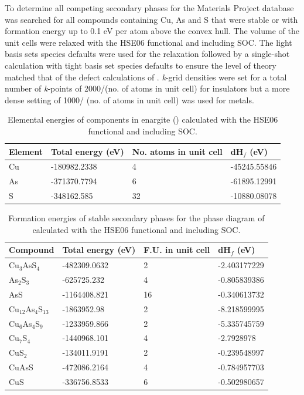 \documentclass[11pt, twoside]{report}
\begin{document}
To determine all competing secondary phases for {\enargite} the Materials Project \cite{materials_project} database was searched for all compounds containing Cu, As and S that were stable or with formation energy up to 0.1 eV per atom above the convex hull. The volume of the unit cells were relaxed with the HSE06 functional and including SOC. The light basis sets species defaults were used for the relaxation followed by a single-shot calculation with tight basis set species defaults to ensure the level of theory matched that of the defect calculations of {\enargite}. \textit{k}-grid densities were set for a total number of \textit{k}-points of 2000/(no. of atoms in unit cell) for insulators but a more dense setting of 1000/ (no. of atoms in unit cell) was used for metals.

\begin{table}[h!]
\begin{tabular}{@{}llll@{}}
\toprule
Element & Total energy (eV) & No. atoms in unit cell & dH$_f$ (eV)      \\ \midrule
Cu      & -180982.2338      & 4                      & -45245.55846 \\
As      & -371370.7794      & 6                      & -61895.12991 \\
S       & -348162.585       & 32                     & -10880.08078 \\ \bottomrule
\end{tabular}
\caption{Elemental energies of components in enargite ({\enargite}) calculated with the HSE06 functional and including SOC.}\label{enargite_elements}
\end{table}

\begin{table}[]\label{enargite_elements}
\begin{tabular}{@{}llll@{}}
\toprule
Compound      & Total energy (eV) & F.U. in unit cell & dH$_f$ (eV)     \\ \midrule
Cu$_3$AsS$_4$ & -482309.0632      & 2                 & -2.403177229 \\
As$_2$S$_3$         & -625725.232       & 4                 & -0.805839386 \\
AsS           & -1164408.821      & 16                & -0.340613732 \\ 
Cu$_12$As$_4$S$_13$    & -1863952.98       & 2                 & -8.218599995 \\
Cu$_6$As$_4$S$_9$      & -1233959.866      & 2                 & -5.335745759 \\
Cu$_7$S$_4$         & -1440968.101      & 4                 & -2.7928978   \\
CuS$_2$          & -134011.9191      & 2                 & -0.239548997 \\
CuAsS         & -472086.2164      & 4                 & -0.784957703 \\
CuS           & -336756.8533      & 6                 & -0.502980657 \\ \bottomrule
\end{tabular}
\caption{Formation energies of stable secondary phases for the phase diagram of {\enargite} calculated with the HSE06 functional and including SOC.}\label{enargite_stable}
\end{table}
\end{document}
